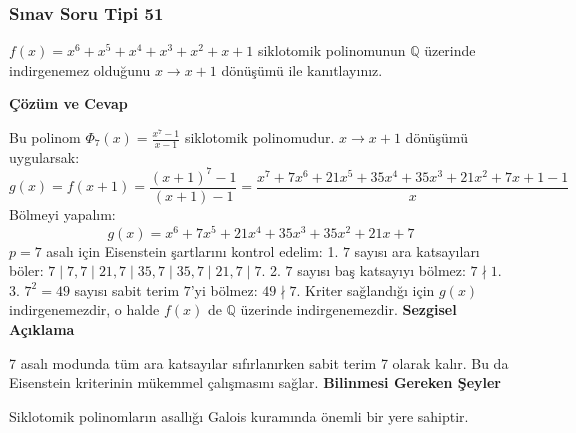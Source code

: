 \documentclass[11pt, a4paper]{article}
\newenvironment{cozum}{
    \vspace{0.5cm}
    \noindent\textcolor{green!60!black}{\faCheckCircle\enspace \textbf{\Large Çözüm ve Cevap}}\par\vspace{0.2cm}
}{}
\newenvironment{sezgisel}{
    \vspace{0.5cm}
    \noindent\textcolor{orange!80!black}{\faLightbulb\enspace \textbf{\Large Sezgisel Açıklama}}\par\vspace{0.2cm}
    \itshape
}{}
\newenvironment{bilgi}{
    \vspace{0.5cm}
    \noindent\textcolor{red!70!black}{\faExclamationTriangle\enspace \textbf{\Large Bilinmesi Gereken Şeyler}}\par\vspace{0.2cm}
}{}
\begin{document}
\subsubsection{Sınav Soru Tipi 51}
\begin{sinavbox}
$f(x) = x^6+x^5+x^4+x^3+x^2+x+1$ siklotomik polinomunun $\mathbb{Q}$ üzerinde indirgenemez olduğunu $x \to x+1$ dönüşümü ile kanıtlayınız.
\end{sinavbox}
\begin{cozum}
Bu polinom $\Phi_7(x) = \frac{x^7-1}{x-1}$ siklotomik polinomudur. $x \to x+1$ dönüşümü uygularsak:
\[ g(x) = f(x+1) = \frac{(x+1)^7-1}{(x+1)-1} = \frac{x^7 + 7x^6 + 21x^5 + 35x^4 + 35x^3 + 21x^2 + 7x + 1 - 1}{x} \]
Bölmeyi yapalım:
\[ g(x) = x^6 + 7x^5 + 21x^4 + 35x^3 + 35x^2 + 21x + 7 \]
$p=7$ asalı için Eisenstein şartlarını kontrol edelim:
1. $7$ sayısı ara katsayıları böler: $7 \mid 7, 7 \mid 21, 7 \mid 35, 7 \mid 35, 7 \mid 21, 7 \mid 7$.
2. $7$ sayısı baş katsayıyı bölmez: $7 \nmid 1$.
3. $7^2 = 49$ sayısı sabit terim $7$'yi bölmez: $49 \nmid 7$.
Kriter sağlandığı için $g(x)$ indirgenemezdir, o halde $f(x)$ de $\mathbb{Q}$ üzerinde indirgenemezdir.
\end{cozum}
\begin{sezgisel}
7 asalı modunda tüm ara katsayılar sıfırlanırken sabit terim 7 olarak kalır. Bu da Eisenstein kriterinin mükemmel çalışmasını sağlar.
\end{sezgisel}
\begin{bilgi}
Siklotomik polinomların asallığı Galois kuramında önemli bir yere sahiptir.
\end{bilgi}

\newpage
\end{document}
